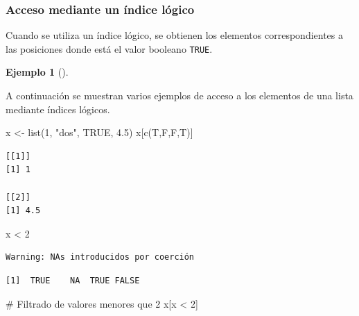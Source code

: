 \documentclass[
  a4paper,
]{scrreport}
\newenvironment{Shaded}{\begin{snugshade}}{\end{snugshade}}
\newcommand{\CommentTok}[1]{\textcolor[rgb]{0.37,0.37,0.37}{#1}}
\newcommand{\ConstantTok}[1]{\textcolor[rgb]{0.56,0.35,0.01}{#1}}
\newcommand{\DecValTok}[1]{\textcolor[rgb]{0.68,0.00,0.00}{#1}}
\newcommand{\FloatTok}[1]{\textcolor[rgb]{0.68,0.00,0.00}{#1}}
\newcommand{\FunctionTok}[1]{\textcolor[rgb]{0.28,0.35,0.67}{#1}}
\newcommand{\NormalTok}[1]{\textcolor[rgb]{0.00,0.23,0.31}{#1}}
\newcommand{\OtherTok}[1]{\textcolor[rgb]{0.00,0.23,0.31}{#1}}
\newcommand{\SpecialCharTok}[1]{\textcolor[rgb]{0.37,0.37,0.37}{#1}}
\newcommand{\StringTok}[1]{\textcolor[rgb]{0.13,0.47,0.30}{#1}}
\theoremstyle{definition}
\theoremstyle{definition}
\newtheorem{example}{Ejemplo}[chapter]
\theoremstyle{remark}
\begin{document}
\hypertarget{acceso-mediante-un-uxedndice-luxf3gico-1}{%
\subsubsection{Acceso mediante un índice
lógico}\label{acceso-mediante-un-uxedndice-luxf3gico-1}}

Cuando se utiliza un índice lógico, se obtienen los elementos
correspondientes a las posiciones donde está el valor booleano
\texttt{TRUE}.

\leavevmode{}%
\begin{example}[]\label{exm-acceso-listas-logico}

A continuación se muestran varios ejemplos de acceso a los elementos de
una lista mediante índices lógicos.

\begin{Shaded}
\begin{Highlighting}[]
\NormalTok{x }\OtherTok{\textless{}{-}} \FunctionTok{list}\NormalTok{(}\DecValTok{1}\NormalTok{, }\StringTok{"dos"}\NormalTok{, }\ConstantTok{TRUE}\NormalTok{, }\FloatTok{4.5}\NormalTok{)}
\NormalTok{x[}\FunctionTok{c}\NormalTok{(T,F,F,T)]}
\end{Highlighting}
\end{Shaded}

\begin{verbatim}
[[1]]
[1] 1

[[2]]
[1] 4.5
\end{verbatim}

\begin{Shaded}
\begin{Highlighting}[]
\NormalTok{x }\SpecialCharTok{\textless{}} \DecValTok{2}
\end{Highlighting}
\end{Shaded}

\begin{verbatim}
Warning: NAs introducidos por coerción
\end{verbatim}

\begin{verbatim}
[1]  TRUE    NA  TRUE FALSE
\end{verbatim}

\begin{Shaded}
\begin{Highlighting}[]
\CommentTok{\# Filtrado de valores menores que 2}
\NormalTok{x[x }\SpecialCharTok{\textless{}} \DecValTok{2}\NormalTok{]}
\end{Highlighting}
\end{Shaded}


\end{example}
\end{document}
